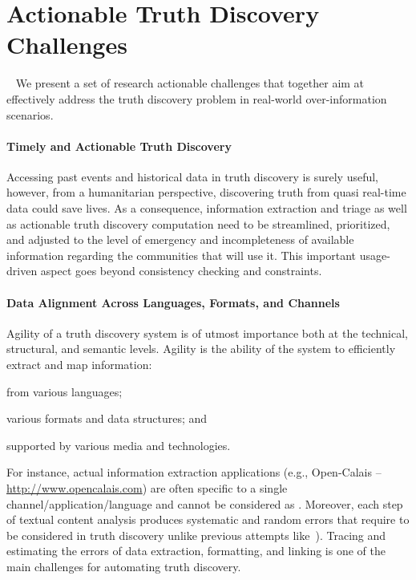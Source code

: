 \documentclass[prodmode,acmtecs]{acmsmall} %
\begin{document}
\section{Actionable Truth Discovery Challenges}~\label{sect:challenges-solutions}
We present a set of research actionable challenges that together aim at effectively address 
the truth discovery problem in real-world over-information scenarios. 

\paragraph*{Timely and Actionable Truth Discovery} 
Accessing past events and historical data in truth discovery is surely useful, however,
from a humanitarian perspective, discovering truth from quasi real-time data 
could save lives. As a consequence, information extraction and triage as well as actionable
truth discovery computation need to be streamlined, prioritized,  and adjusted to the level 
of emergency and incompleteness of available information regarding the communities that will 
use it. This important usage-driven aspect goes beyond consistency checking and constraints.
%

\paragraph*{Data Alignment Across Languages, Formats, and Channels} 
Agility of a truth discovery system is of utmost importance both at 
the technical, structural, and semantic levels. 
Agility is the ability of the system 
to efficiently extract and map information: 
\begin{inparaenum}[(i)]
\item from various languages;
\item various formats and data structures; and
\item supported by various media and technologies.
\end{inparaenum}
For instance, actual information extraction applications (e.g., Open-Calais -- \url{http://www.opencalais.com})  
are often specific to a single channel/application/language and cannot be considered as . Moreover,
each step of textual content analysis produces systematic and random errors that 
require to be considered in truth discovery unlike previous attempts like~\cite{GoasdoueKKLMZ13}). 
Tracing and estimating  the errors of data extraction, formatting, and linking
is one of the main challenges for automating truth discovery. 
%
\end{document}
